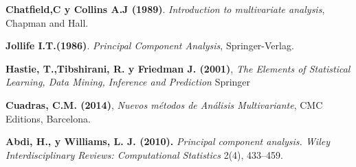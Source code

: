 
\begin{thebibliography}{99}
	

 \textbf{Chatfield,C y Collins A.J (1989)}. {\em Introduction to multivariate analysis}, Chapman and Hall.

 \textbf{Jollife I.T.(1986)}. {\em Principal Component Analysis}, Springer-Verlag.

 \textbf{Hastie, T.,Tibshirani, R. y Friedman J. (2001)}, \textit{The Elements of Statistical Learning, Data Mining, Inference and Prediction} Springer 

 \textbf{Cuadras, C.M. (2014)}, \textit{Nuevos métodos de Análisis Multivariante}, CMC Editions, Barcelona. 

 \textbf{Abdi, H., y Williams, L. J. (2010).} \textit{Principal component analysis. Wiley Interdisciplinary Reviews: Computational Statistics}  2(4), 433–459. 
          
        
\end{thebibliography}
 